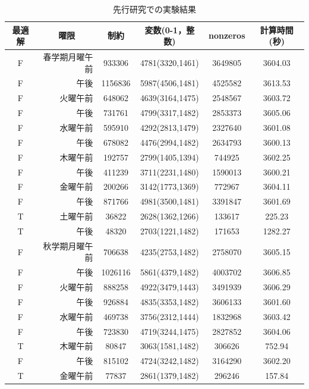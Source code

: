 \documentclass[12pt, a4paper, fleqn]{jreport}
\begin{document}
\begin{table}[H]
\begin{center}
\caption{先行研究での実験結果}
\label{senkou_kekka}
  \begin{tabular}{cr|cccc}
\hline
最適解& \multicolumn{1}{c|}{曜限} & 制約 & 変数(0-1，整数) & nonzeros & 計算時間(秒)\\
\hline\hline
F&春学期月曜午前 & 933306 & 4781(3320,1461) & 3649805 & 3604.03\\
F&午後           & 1156836& 5987(4506,1481) & 4525582 & 3613.53\\
F&火曜午前       & 648062 & 4639(3164,1475) & 2548567 & 3603.72\\
F&午後           & 731761 & 4799(3317,1482) & 2853373 & 3605.06\\
F&水曜午前       & 595910 & 4292(2813,1479) & 2327640 & 3601.08\\
F&午後           & 678082 & 4476(2994,1482) & 2634793 & 3600.13\\
F&木曜午前       & 192757 & 2799(1405,1394) & 744925  & 3602.25\\
F&午後           & 411239 & 3711(2231,1480) & 1590013 & 3600.21\\
F&金曜午前       & 200266 & 3142(1773,1369) & 772967  & 3604.11\\
F&午後           & 871766 & 4981(3500,1481) & 3391847 & 3601.69\\
T&土曜午前       & 36822  & 2628(1362,1266) & 133617  & 225.23 \\
T&午後           & 48320  & 2703(1221,1482) & 171653  & 1282.27\\
\hline
F&秋学期月曜午前 & 706638 & 4235(2753,1482) & 2758070 & 3605.15\\
F&午後           &1026116 & 5861(4379,1482) & 4003702 & 3606.85\\
F&火曜午前       & 888258 & 4922(3479,1443) & 3491939 & 3606.29\\
F&午後           & 926884 & 4835(3353,1482) & 3606133 & 3601.60\\
F&水曜午前       & 469738 & 3756(2312,1444) & 1832968 & 3603.42\\
F&午後           & 723830 & 4719(3244,1475) & 2827852 & 3604.06\\
T&木曜午前       &  80847 & 3063(1581,1482) & 306626  & 752.94 \\
F&午後           & 815102 & 4724(3242,1482) & 3164290 & 3602.20\\
T&金曜午前       &  77837 & 2861(1379,1482) & 296246  & 157.84 \\

\end{tabular}
\end{center}
\end{table}
\end{document}
